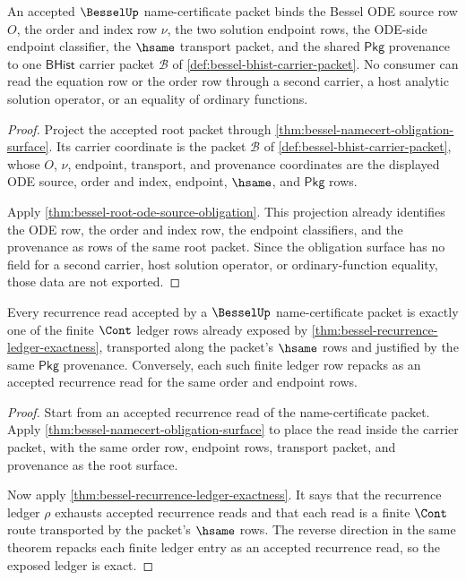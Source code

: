 \begin{theorem}
\label{thm:bessel-carrier-equation-order-obligation}
An accepted $\BesselUp$ name-certificate packet binds the Bessel ODE source row
$O$, the order and index row $\nu$, the two solution endpoint rows, the
ODE-side endpoint classifier, the $\hsame$ transport packet, and the shared
$\mathsf{Pkg}$ provenance to one $\mathsf{BHist}$ carrier packet
$\mathcal B$ of \autoref{def:bessel-bhist-carrier-packet}. No consumer can
read the equation row or the order row through a second carrier, a host
analytic solution operator, or an equality of ordinary functions.
\end{theorem}
\begin{proof}
Project the accepted root packet through
\autoref{thm:bessel-namecert-obligation-surface}. Its carrier coordinate is
the packet $\mathcal B$ of \autoref{def:bessel-bhist-carrier-packet}, whose
$O$, $\nu$, endpoint, transport, and provenance coordinates are the displayed
ODE source, order and index, endpoint, $\hsame$, and $\mathsf{Pkg}$ rows.

Apply \autoref{thm:bessel-root-ode-source-obligation}. This projection already
identifies the ODE row, the order and index row, the endpoint classifiers, and
the provenance as rows of the same root packet. Since the obligation surface
has no field for a second carrier, host solution operator, or ordinary-function
equality, those data are not exported.
\end{proof}

\begin{theorem}
\label{thm:bessel-recurrence-cont-ledger-obligation}
Every recurrence read accepted by a $\BesselUp$ name-certificate packet is
exactly one of the finite $\Cont$ ledger rows already exposed by
\autoref{thm:bessel-recurrence-ledger-exactness}, transported along the packet's
$\hsame$ rows and justified by the same $\mathsf{Pkg}$ provenance. Conversely,
each such finite ledger row repacks as an accepted recurrence read for the
same order and endpoint rows.
\end{theorem}
\begin{proof}
Start from an accepted recurrence read of the name-certificate packet. Apply
\autoref{thm:bessel-namecert-obligation-surface} to place the read inside the
carrier packet, with the same order row, endpoint rows, transport packet, and
provenance as the root surface.

Now apply \autoref{thm:bessel-recurrence-ledger-exactness}. It says that the
recurrence ledger $\rho$ exhausts accepted recurrence reads and that each read
is a finite $\Cont$ route transported by the packet's $\hsame$ rows. The
reverse direction in the same theorem repacks each finite ledger entry as an
accepted recurrence read, so the exposed ledger is exact.
\end{proof}

